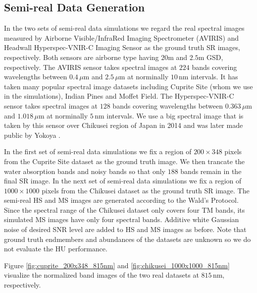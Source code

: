\subsection{Semi-real Data Generation} \label{sec:data_gen_real}
In the two sets of semi-real data simulations we regard the real spectral
images measured by Airborne Visible/InfraRed Imaging Spectrometer (AVIRIS)
\cite{AVIRIS}
and Headwall Hyperspec-VNIR-C Imaging Sensor
\cite{NYOKOYA2016,
      HEADWALL_HYPERSPEC_VNIR_C}
as the ground truth SR images, respectively.
Both sensors are airborne type having $20$m and $2.5$m GSD, respectively.
The AVIRIS sensor takes spectral images at $224$ bands covering wavelengths
between $0.4\,\mu$m and $2.5\,\mu$m at norminally $10\,$nm intervals.
It has taken many popular spectral image datasets including Cuprite Site (whom
we use in the simulations), Indian Pines and Moffet Field.
The Hyperspec-VNIR-C sensor takes spectral images at $128$ bands covering
wavelengths between $0.363\,\mu$m and $1.018\,\mu$m at norminally $5\,$nm
intervals.
We use a big spectral image that is taken by this sensor over Chikusei region
of Japan in 2014
\cite{NYOKOYA2016}
and was later made public by Yokoya \etal.

In the first set of semi-real data simulations we fix a region of $200\times348$
pixels from the Cuprite Site dataset as the ground truth image.
We then trancate the water absorption bands and noisy bands so that only $188$
bands remain in the final SR image.
In the next set of semi-real data simulations we fix a region of
$1000 \times 1000$ pixels from the Chikusei dataset as the ground truth SR
image.
The semi-real HS and MS images are generated according to the Wald's Protocol.
Since the spectral range of the Chikusei dataset only covers four TM bands,
its simulated MS images have only four spectral bands.
Additive white Gaussian noise of desired SNR level are added to HS and MS
images as before.
Note that ground truth endmembers and abundances of the datasets are unknown
so we do not evaluate the HU performance.

Figure \ref{fig:cuprite_200x348_815nm} and \ref{fig:chikusei_1000x1000_815nm}
visualize the normalized band images of the two real datasets at $815\,$nm,
respectively.

